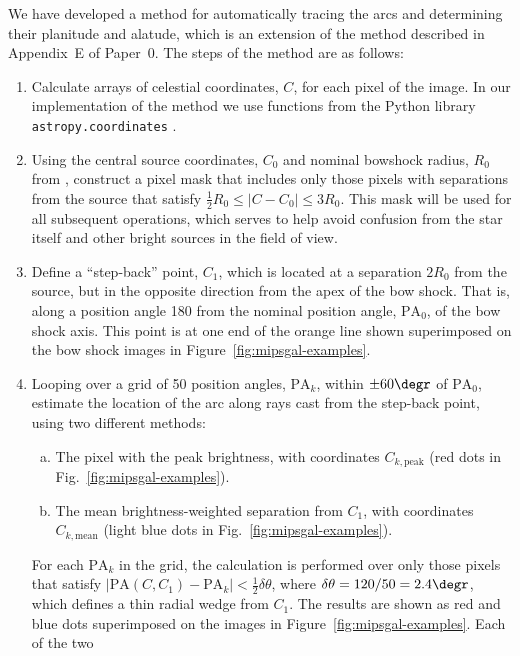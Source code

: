 We have developed a method for automatically tracing the arcs and
determining their planitude and alatude, which is an extension of the
method described in Appendix~E of Paper~0.  The steps of the method
are as follows:
\begin{enumerate}[1.]
\item Calculate arrays of celestial coordinates, \(C\), for each pixel
  of the image. In our implementation of the method we use functions
  from the Python library \texttt{astropy.coordinates}
  \citep{Astropy-Collaboration:2018a}.
\item Using the central source coordinates, \(C_0\) and nominal
  bowshock radius, \(R_0\) from \citet{Kobulnicky:2016a}, construct a
  pixel mask that includes only those pixels with separations from the
  source that satisfy \(\frac12 R_0 \le |C - C_0| \le 3 R_0\).  This mask
  will be used for all subsequent operations, which serves to help
  avoid confusion from the star itself and other bright sources in the
  field of view.
\item Define a ``step-back'' point, \(C_1\), which is located at a
  separation \(2 R_0\) from the source, but in the opposite direction
  from the apex of the bow shock. That is, along a position angle
  180\degr{} from the nominal position angle, \(\text{PA}_0\), of the
  bow shock axis.  This point is at one end of the orange line shown
  superimposed on the bow shock images in
  Figure~\ref{fig:mipsgal-examples}.
\item Looping over a grid of 50 position angles, \(\text{PA}_k\),
  within \(\pm 60\degr\) of \(\text{PA}_0\), estimate the location of
  the arc along rays cast from the step-back point, using two
  different methods:
  \begin{enumerate}[(a)]
  \item The pixel with the peak brightness, with coordinates
    \(C_{k,\text{peak}}\) (red dots in
    Fig.~\ref{fig:mipsgal-examples}).
  \item The mean brightness-weighted separation from \(C_1\), with
    coordinates \(C_{k,\text{mean}}\) (light blue dots in
    Fig.~\ref{fig:mipsgal-examples}).
  \end{enumerate}
  For each \(\text{PA}_k\) in the grid, the calculation is performed
  over only those pixels that satisfy
  \(|\text{PA}(C, C_1) - \text{PA}_k| < \frac12 \delta\theta\), where
  \(\delta\theta = 120/50 = 2.4\degr\), which defines a thin radial wedge from
  \(C_1\).  The results are shown as red and blue dots superimposed on
  the images in Figure~\ref{fig:mipsgal-examples}. Each of the two

\end{enumerate}
